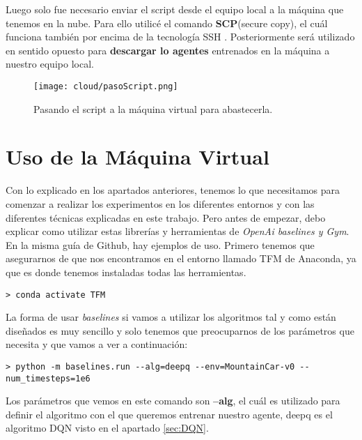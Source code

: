 \documentclass[11pt,fleqn]{book} %
\begin{document}
Luego solo fue necesario enviar el script desde el equipo local a la máquina que tenemos en la nube. Para ello utilicé el comando \textbf{SCP}(secure copy), el cuál funciona también por encima de la tecnología SSH \cite{article:scp}. Posteriormente será utilizado en sentido opuesto para \textbf{descargar lo agentes} entrenados en la máquina a nuestro equipo local. \\

\begin{figure}[H]
	\centering\texttt{[image: cloud/pasoScript.png]}
	\caption{Pasando el script a la máquina virtual para abastecerla.}
	\label{fig:usoSCP} %
\end{figure} 

\section{Uso de la Máquina Virtual}

Con lo explicado en los apartados anteriores, tenemos lo que necesitamos para comenzar a realizar los experimentos en los diferentes entornos y con las diferentes técnicas explicadas en este trabajo. Pero antes de empezar, debo explicar como utilizar estas librerías y herramientas de \textit{OpenAi baselines y Gym}. \\

En la misma guía de Github\cite{article:baselines}, hay ejemplos de uso. Primero tenemos que asegurarnos de que nos encontramos en el entorno llamado TFM de Anaconda, ya que es donde tenemos instaladas todas las herramientas. \\

\begin{verbatim}
> conda activate TFM
\end{verbatim}

La forma de usar \textit{baselines} si vamos a utilizar los algoritmos tal y como están diseñados es muy sencillo y solo tenemos que preocuparnos de los parámetros que necesita y que vamos a ver a continuación:

\begin{verbatim}
> python -m baselines.run --alg=deepq --env=MountainCar-v0 --num_timesteps=1e6
\end{verbatim}

Los parámetros que vemos en este comando son \textbf{--alg}, el cuál es utilizado para definir el algoritmo con el que queremos entrenar nuestro agente, deepq es el algoritmo DQN visto en el apartado \ref{sec:DQN}. \\
\end{document}
